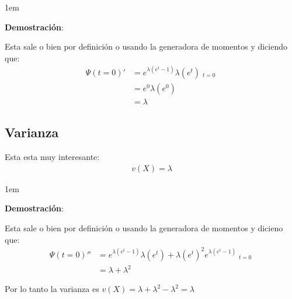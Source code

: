 \documentclass[12pt, fleqn]{report}                             %
\newenvironment{SmallIndentation}[1][0.75em]                    %
        {\begin{adjustwidth}{#1}{}\begin{footnotesize}}             %
        {\end{footnotesize}\end{adjustwidth}}                       %
\theoremstyle{break}                                            %
\DeclareMathOperator \Evaluate  {\Big|}                         %
\begin{document}
                \begin{SmallIndentation}[1em]
                    \textbf{Demostración}:
                    
                    Esta sale o bien por definición o usando la generadora de momentos y diciendo que:
                    \begin{align*}
                        \Psi(t = 0)'
                            &= e^{\lambda(e^t - 1)} \lambda(e^t) \Evaluate_{t = 0}      \\
                            &= e^{0} \lambda(e^0)                                       \\
                            &= \lambda
                    \end{align*}
                    
                \end{SmallIndentation}


            \vspace{1em}
            \subsection{Varianza}

                Esta esta muy interesante:
                \begin{align*}
                    v(X) = \lambda               
                \end{align*}

                \begin{SmallIndentation}[1em]
                    \textbf{Demostración}:
                    
                    Esta sale o bien por definición o usando la generadora de momentos y dicieno que:
                    \begin{align*}
                        \Psi(t = 0)''
                            &= e^{\lambda(e^t - 1)} \lambda(e^t) + \lambda (e^t)^2 e^{\lambda(e^t - 1)} \Evaluate_{t = 0} \\
                            &= \lambda + \lambda^2                                       
                    \end{align*}

                    Por lo tanto la varianza es $v(X) = \lambda + \lambda^2 - \lambda^2 = \lambda$
                
                \end{SmallIndentation}
                
\end{document}
